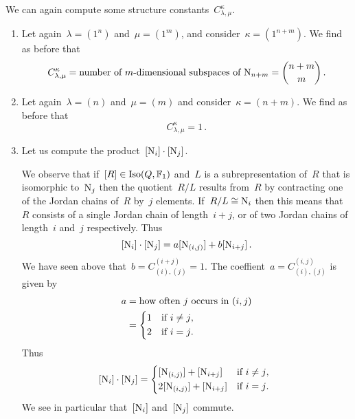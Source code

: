 \documentclass[a4paper,11pt]{scrartcl}
\begin{document}
\begin{example}
  \label{computing multiplication over F1}
  We can again compute some structure constants~$C^\kappa_{\lambda, \mu}$.
  \begin{enumerate}
    \item
      Let again~$\lambda = (1^n)$ and~$\mu = (1^m)$, and consider~$\kappa = (1^{n+m})$.
      We find as before that
      \[
        C^{\kappa}_{\lambda, \mu}
        =
        \text{number of~\dimensional{$m$} subspaces of~$\Nil_{n+m}$}
        =
        \binom{n+m}{m} \,.
      \]
    \item
      Let again~$\lambda = (n)$ and~$\mu = (m)$ and consider~$\kappa = (n+m)$.
      We find as before that
      \[
        C^{\kappa}_{\lambda, \mu} = 1 \,.
      \]
    \item
      Let us compute the product~$[\mathrm{N}_i] \cdot [\mathrm{N}_j]$.

      We observe that if~$[R] \in \operatorname{Iso}(Q, \mathbb{F}_1)$ and~$L$ is a subrepresentation of~$R$ that is isomorphic to~$\mathrm{N}_j$ then the quotient~$R/L$ results from~$R$ by contracting one of the Jordan chains of~$R$ by~$j$ elements.
      If~$R/L \cong \mathrm{N}_i$ then this means that~$R$ consists of a single Jordan chain of length~$i+j$, or of two Jordan chains of length~$i$ and~$j$ respectively.
      Thus
      \[
        [\mathrm{N}_i] \cdot [\mathrm{N}_j]
        =
        a [ \mathrm{N}_{(i,j)} ]
        +
        b [ \mathrm{N}_{i+j} ] \,.
      \]
      We have seen above that~$b = C^{(i+j)}_{(i),(j)} = 1$.
      The coeffient~$a = C^{(i,j)}_{(i),(j)}$ is given by
      \begin{align*}
        a
        &=
        \text{how often~$j$ occurs in~$(i,j)$}
        \\
        &=
        \begin{cases*}
          1
          &
          if~$i \neq j$,
          \\
          2
          &
          if~$i = j$.
        \end{cases*}
      \end{align*}
      Thus
      \[
        \class{\Nil_i} \cdot \class{\Nil_j}
        =
        \begin{cases*}
          \class{\Nil_{(i,j)}} + \class{\Nil_{i+j}}
          &
          if~$i \neq j$,
          \\
          2 \class{\Nil_{(i,j)}} + \class{\Nil_{i+j}}
          &
          if~$i = j$.
        \end{cases*}
      \]
      We see in particular that~$[\mathrm{N}_i]$ and~$[\mathrm{N}_j]$ commute.
  \end{enumerate}
\end{example}
\end{document}
